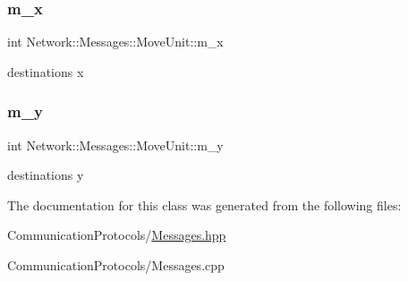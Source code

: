 \subsubsection{\texorpdfstring{m\+\_\+x}{m\_x}}
{\footnotesize\ttfamily int Network\+::\+Messages\+::\+Move\+Unit\+::m\+\_\+x}

destination\textquotesingle{}s x \mbox{\label{class_network_1_1_messages_1_1_move_unit_a11b0de19e2d287594045a97a70b79f4b}} 
\subsubsection{\texorpdfstring{m\+\_\+y}{m\_y}}
{\footnotesize\ttfamily int Network\+::\+Messages\+::\+Move\+Unit\+::m\+\_\+y}

destination\textquotesingle{}s y 

The documentation for this class was generated from the following files\+:\begin{DoxyCompactItemize}
\item 
Communication\+Protocols/\hyperlink{_messages_8hpp}{Messages.\+hpp}\item 
Communication\+Protocols/Messages.\+cpp\end{DoxyCompactItemize}
